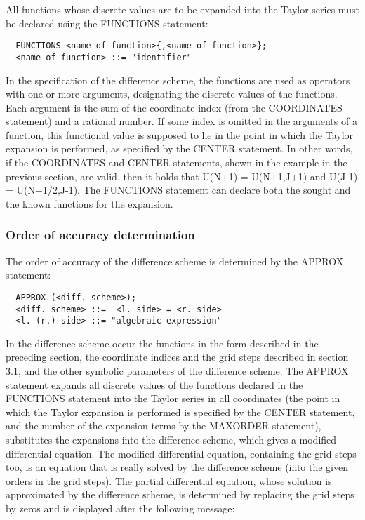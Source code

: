      All functions  whose discrete  values are  to be  expanded into the
Taylor series must be declared using the FUNCTIONS statement:
\begin{verbatim}
  FUNCTIONS <name of function>{,<name of function>};
  <name of function> ::= "identifier"
\end{verbatim}
In the specification of the difference scheme, the functions are used as
operators with one or more arguments, designating the discrete values of
the functions. Each argument is the  sum of  the coordinate  index (from
the  COORDINATES  statement)  and  a  rational  number. If some index is
omitted in  the  arguments  of  a  function,  this  functional  value is
supposed to lie in the point in which the Taylor expansion is performed,
as specified by the CENTER statement. In other words, if the COORDINATES
and CENTER statements, shown in the example in the previous section, are
valid, then it holds that U(N+1) = U(N+1,J+1) and U(J-1) = U(N+1/2,J-1).
The  FUNCTIONS  statement  can  declare  both  the  sought and the known
functions for the expansion.




\subsubsection{Order of accuracy determination}


     The order of accuracy of the difference scheme is determined by the
APPROX statement:
\begin{verbatim}
  APPROX (<diff. scheme>);
  <diff. scheme> ::=  <l. side> = <r. side>
  <l. (r.) side> ::= "algebraic expression"
\end{verbatim}
In the  difference scheme  occur the  functions in the form described in
the  preceding  section,  the  coordinate  indices  and  the  grid steps
described  in  section  3.1,  and  the  other symbolic parameters of the
difference scheme. The APPROX statement expands  all discrete  values of
the functions declared in the FUNCTIONS statement into the Taylor series
in all coordinates (the point in which the Taylor expansion is performed
is specified  by the  CENTER statement,  and the number of the expansion
terms by the MAXORDER  statement), substitutes  the expansions  into the
difference  scheme,  which  gives  a modified differential equation. The
modified differential equation, containing the  grid  steps  too,  is an
equation that  is really solved by the difference scheme (into the given
orders in the grid steps).
     The partial differential equation,  whose solution  is approximated
by the  difference scheme,  is determined by replacing the grid steps by
zeros and is displayed after the following message:

